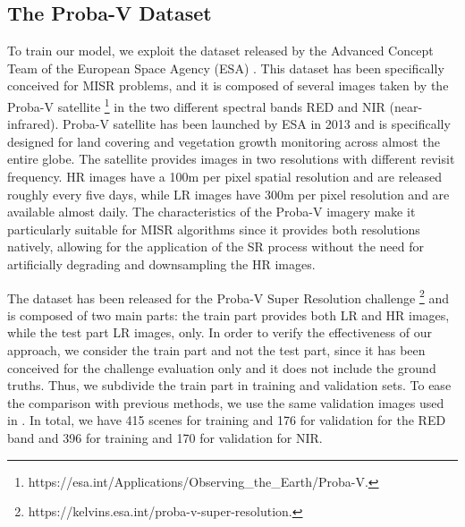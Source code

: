 \documentclass[journal]{IEEEtran}
\begin{document}
\subsection{The Proba-V Dataset}
To train our model, we exploit the dataset released by the Advanced Concept Team of the European Space Agency (ESA) \cite{martens2019super}. This dataset has been specifically conceived for MISR problems, and it is composed of several images taken by the Proba-V satellite \footnote{https://esa.int/Applications/Observing\_the\_Earth/Proba-V.} in the two different spectral bands RED and NIR (near-infrared). Proba-V satellite has been launched by ESA in 2013 and is specifically designed for land covering and vegetation growth monitoring across almost the entire globe. The satellite provides images in two resolutions with different revisit frequency. HR images have a 100m per pixel spatial resolution and are released roughly every five days, while LR images have 300m per pixel resolution and are available almost daily. The characteristics of the Proba-V imagery make it particularly suitable for MISR algorithms since it provides both resolutions natively, allowing for the application of the SR process without the need for artificially degrading and downsampling the HR images.

The dataset has been released for the Proba-V Super Resolution challenge \footnote{https://kelvins.esa.int/proba-v-super-resolution.} and is composed of two main parts: the train part provides both LR and HR images, while the test part LR images, only. In order to verify the effectiveness of our approach, we consider the train part and not the test part, since it has been conceived for the challenge evaluation only and it does not include the ground truths. Thus, we subdivide the train part in training and validation sets. To ease the comparison with previous methods, we use the same validation images used in \cite{molini2019deepsum}. In total, we have 415 scenes for training and 176 for validation for the RED band and 396 for training and 170 for validation for NIR.
\end{document}
